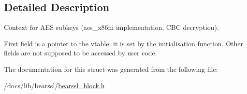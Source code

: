 \subsection{Detailed Description}
Context for A\+ES subkeys ({\ttfamily aes\+\_\+x86ni} implementation, C\+BC decryption). 

First field is a pointer to the vtable; it is set by the initialisation function. Other fields are not supposed to be accessed by user code. 

The documentation for this struct was generated from the following file\+:\begin{DoxyCompactItemize}
\item 
/docs/lib/bearssl/\hyperlink{bearssl__block_8h}{bearssl\+\_\+block.\+h}\end{DoxyCompactItemize}
